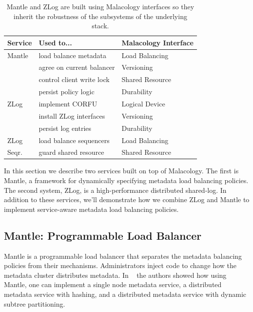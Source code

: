 \documentclass[preprint]{sigplanconf-eurosys}
\begin{document}
\label{services}
\begin{table}
\centering
\begin{tabular}{  l | l | l }
\textbf{Service}              &
\textbf{Used to...}           &
\textbf{Malacology Interface} \\ \hline
Mantle & load balance metadata     & Load Balancing  \\
       & agree on current balancer & Versioning      \\ 
       & control client write lock & Shared Resource \\
       & persist policy logic      & Durability      \\ \hline
ZLog   & implement CORFU           & Logical Device  \\ 
       & install ZLog interfaces   & Versioning      \\
       & persist log entries       & Durability      \\ \hline
ZLog   & load balance sequencers   & Load Balancing  \\
Seqr.  & guard shared resource     & Shared Resource \\ 
\end{tabular}
\caption{Mantle and ZLog are built using Malacology interfaces so they inherit the
robustness of the subsystems of the underlying stack.}
\label{table:implementation}
\end{table}

In this section we describe two services built on top of Malacology. The first
is Mantle, a framework for dynamically specifying metadata load balancing
policies. The second system, ZLog, is a high-performance distributed shared-log.
In addition to these services, we'll demonstrate how we combine ZLog and Mantle
to implement service-aware metadata load balancing policies.

\subsection{Mantle: Programmable Load Balancer}
\label{sec:mantle}

Mantle is a programmable load balancer that separates the metadata balancing
policies from their mechanisms. Administrators inject code to change how the
metadata cluster distributes metadata. In ~\cite{sevilla:sc15-mantle} the
authors showed how using Mantle, one can implement a single node metadata
service, a distributed metadata service with hashing, and a distributed
metadata service with dynamic subtree partitioning. 
\end{document}
